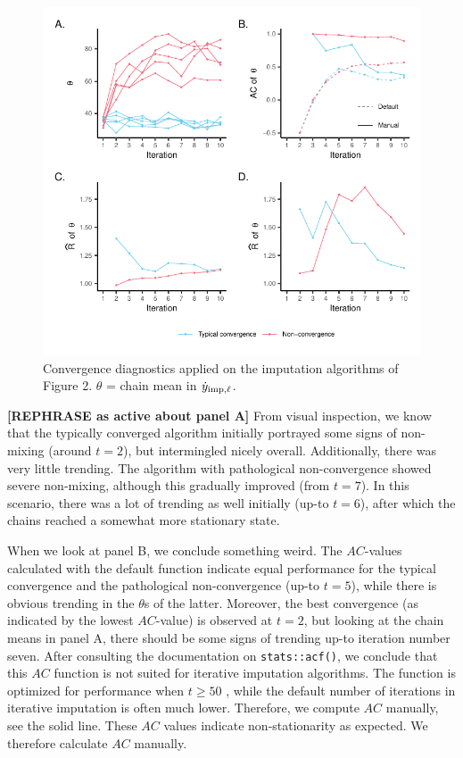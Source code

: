 \documentclass[Royal,times,sageh]{sagej}
\begin{document}
\begin{figure}

{\centering \includegraphics{2.Manuscript_files/figure-latex/diagnostics-1} 

}

\caption{Convergence diagnostics applied on the imputation algorithms of Figure 2. $\theta$ = chain mean in $ \dot y_{\rm imp, \ell} $.}\label{fig:diagnostics}
\end{figure}

\textbf{{[}REPHRASE as active about panel A{]}} From visual inspection, we know that the typically converged algorithm initially portrayed some signs of non-mixing (around \(t=2\)), but intermingled nicely overall. Additionally, there was very little trending. The algorithm with pathological non-convergence showed severe non-mixing, although this gradually improved (from \(t=7\)). In this scenario, there was a lot of trending as well initially (up-to \(t=6\)), after which the chains reached a somewhat more stationary state.

When we look at panel B, we conclude something weird. The \(AC\)-values calculated with the default function indicate equal performance for the typical convergence and the pathological non-convergence (up-to \(t=5\)), while there is obvious trending in the \(\theta\)s of the latter. Moreover, the best convergence (as indicated by the lowest \(AC\)-value) is observed at \(t=2\), but looking at the chain means in panel A, there should be some signs of trending up-to iteration number seven. After consulting the documentation on \texttt{stats::acf()}, we conclude that this \(AC\) function is not suited for iterative imputation algorithms. The function is optimized for performance when \(t\geq50\) \citep{box15}, while the default number of iterations in iterative imputation is often much lower. Therefore, we compute \(AC\) manually, see the solid line. These \(AC\) values indicate non-stationarity as expected. We therefore calculate \(AC\) manually.
\end{document}
